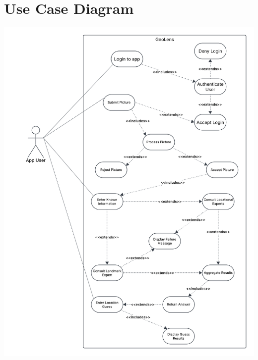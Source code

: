 \documentclass[]{article}
\begin{document}
\section{Use Case Diagram}
\label{sec:use_case_diagram}
\includegraphics[scale=0.8]{usecase}
\end{document}
